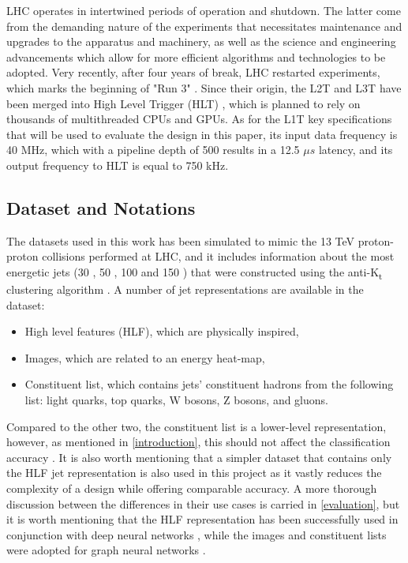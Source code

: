 LHC operates in intertwined periods of operation and shutdown. The latter come from the demanding nature of the experiments that necessitates maintenance and upgrades to the apparatus and machinery, as well as the science and engineering advancements which allow for more efficient algorithms and technologies to be adopted. Very recently, after four years of break, LHC restarted experiments, which marks the beginning of "Run 3" \cite{70-keanecern's}. Since their origin, the L2T and L3T have been merged into High Level Trigger (HLT) \citep[p.47]{49-tappertriggering}, which is planned to rely on thousands of multithreaded CPUs and GPUs. As for the L1T key specifications that will be used to evaluate the design in this paper, its input data frequency is 40 MHz, which with a pipeline depth of 500 results in a 12.5 \(\mu s\) latency, and its output frequency to HLT is equal to 750 kHz.

\subsection{Dataset and Notations}
The datasets used in this work has been simulated to mimic the 13 TeV proton-proton collisions performed at LHC, and it includes information about the most energetic jets \cite{61-coleman2018importance} (30 \cite{31-pierinihls4ml}, 50 \cite{32-pierinihls4ml}, 100 \cite{33-pierinihls4ml} and 150 \cite{34-pierinihls4ml}) that were constructed using the anti-K\textsubscript{t} clustering algorithm \cite{35-cacciari2008anti-kt}. A number of jet representations are available in the dataset:

\begin{itemize}
  \item High level features (HLF), which are physically inspired,
  \item Images, which are related to an energy heat-map,
  \item Constituent list, which contains jets' constituent hadrons from the following list: light quarks, top quarks, W bosons, Z bosons, and gluons.
\end{itemize}

Compared to the other two, the constituent list is a lower-level representation, however, as mentioned in \cref{introduction}, this should not affect the classification accuracy \cite{7-moore2019reports}. It is also worth mentioning that a simpler dataset that contains only the HLF jet representation \cite{36-kreinar2018fast} is also used in this project as it vastly reduces the complexity of a design while offering comparable accuracy. A more thorough discussion between the differences in their use cases is carried in \cref{evaluation}, but it is worth mentioning that the HLF representation has been successfully used in conjunction with deep neural networks \cite{36-kreinar2018fast}, while the images and constituent lists were adopted for graph neural networks \cite{9-newman2019jedi-net:}.

